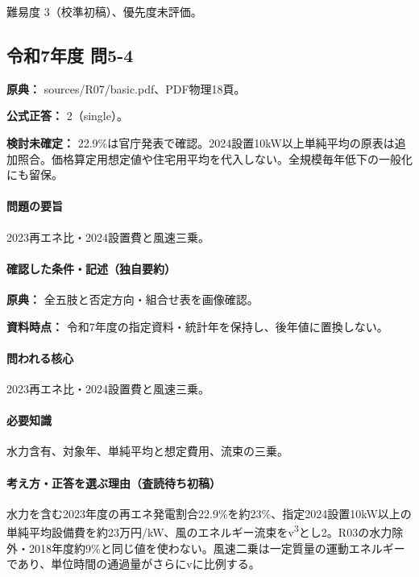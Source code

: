 \par 難易度 3（校準初稿）、優先度未評価。

\subsection{令和7年度 問5-4}
\label{q:r07-reg-basic-5-4}

\noindent\textbf{原典：} sources/R07/basic.pdf、PDF物理18頁。

\textbf{公式正答：} 2（single）。

\par\textbf{検討未確定：} 22.9\%は官庁発表で確認。2024設置10kW以上単純平均の原表は追加照合。価格算定用想定値や住宅用平均を代入しない。全規模毎年低下の一般化にも留保。

\paragraph{問題の要旨} 2023再エネ比・2024設置費と風速三乗。

\paragraph{確認した条件・記述（独自要約）}\mbox{}\par

\noindent\textbf{原典：} 全五肢と否定方向・組合せ表を画像確認。\par

\noindent\textbf{資料時点：} 令和7年度の指定資料・統計年を保持し、後年値に置換しない。\par

\paragraph{問われる核心} 2023再エネ比・2024設置費と風速三乗。

\paragraph{必要知識} 水力含有、対象年、単純平均と想定費用、流束の三乗。

\paragraph{考え方・正答を選ぶ理由（査読待ち初稿）} 水力を含む2023年度の再エネ発電割合22.9\%を約23\%、指定2024設置10kW以上の単純平均設備費を約23万円/kW、風のエネルギー流束をv\textsuperscript{3}とし2。R03の水力除外・2018年度約9\%と同じ値を使わない。風速二乗は一定質量の運動エネルギーであり、単位時間の通過量がさらにvに比例する。

